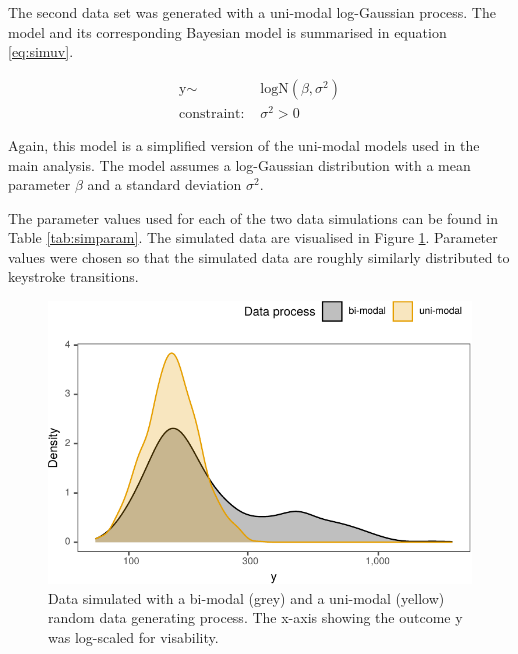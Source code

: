 \documentclass[
  english,
  man,floatsintext]{apa7}
\begin{document}
\begin{appendix}
The second data set was generated with a uni-modal log-Gaussian process.
The model and its corresponding Bayesian model is summarised in equation
\ref{eq:simuv}.

\begin{equation}
\begin{aligned}
\label{eq:simuv}
\text{y} \sim\text{ }& \text{logN}(\beta, \sigma^2)\\
\text{constraint: } & \sigma^2>0
\end{aligned}
\end{equation}

Again, this model is a simplified version of the uni-modal models used
in the main analysis. The model assumes a log-Gaussian distribution with
a mean parameter \(\beta\) and a standard deviation \(\sigma^2\).

The parameter values used for each of the two data simulations can be
found in Table \ref{tab:simparam}. The simulated data are visualised in
Figure \ref{fig:simdata}. Parameter values were chosen so that the
simulated data are roughly similarly distributed to keystroke
transitions.

\begin{figure}

{\centering \includegraphics{manuscript_files/figure-latex/simdata-1} 

}

\caption{Data simulated with a bi-modal (grey) and a uni-modal (yellow) random data generating process. The x-axis showing the outcome y was log-scaled for visability.}\label{fig:simdata}
\end{figure}


\end{appendix}
\end{document}
